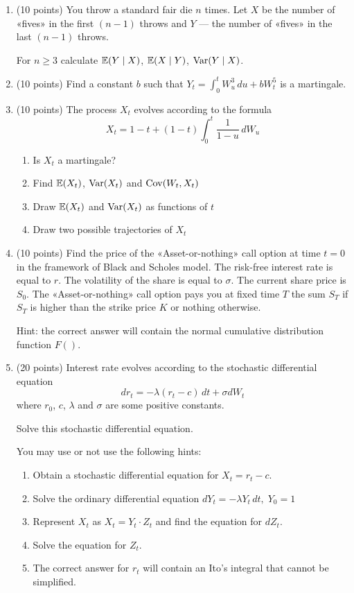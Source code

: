 \documentclass[12pt, a4paper]{article}
\begin{document}
\begin{enumerate}


\item (10 points) You throw a standard fair die $n$ times. Let $X$ be the number of «fives» in the first $(n-1)$ throws and $Y$ — the number of «fives» in the last $(n-1)$ throws.

For $n\geq 3$ calculate $\operatorname{\mathbb{E}}(Y \mid X)$, $\operatorname{\mathbb{E}}(X \mid Y)$, $\operatorname{Var}(Y \mid X)$.

\item (10 points) Find a constant $b$ such that $Y_t = \int_0^t W_u^3 \, du + b W_t^5$ is a martingale.


\item (10 points) The process $X_t$ evolves according to the formula
\[
X_t = 1 - t + (1 - t) \int_0^t \frac{1}{1-u} \, dW_u
\]

\begin{enumerate}
\item Is $X_t$ a martingale?
\item Find $\operatorname{\mathbb{E}}(X_t)$, $\operatorname{Var}(X_t)$ and $\operatorname{Cov}(W_t, X_t)$
\item Draw $\operatorname{\mathbb{E}}(X_t)$ and $\operatorname{Var}(X_t)$ as functions of $t$
\item Draw two possible trajectories of $X_t$
\end{enumerate}


\item (10 points) Find the price of the «Asset-or-nothing» call option at time $t=0$ in the framework of Black and Scholes model. The risk-free interest rate is equal to $r$. The volatility of the share is equal to $\sigma$. The current share price is $S_0$. The «Asset-or-nothing» call option pays you at fixed time $T$ the sum $S_T$ if $S_T$ is higher than the strike price $K$ or nothing otherwise.

Hint: the correct answer will contain the normal cumulative distribution function $F()$.

\item (20 points) Interest rate evolves according to the stochastic differential equation
\[
dr_t = -\lambda (r_t - c) \, dt + \sigma dW_t
\]
where $r_0$, $c$, $\lambda$ and $\sigma$ are some positive constants.

Solve this stochastic differential equation.

You may use or not use the following hints:

\begin{enumerate}
\item Obtain a stochastic differential equation for $X_t = r_t - c$.
\item Solve the ordinary differential equation $dY_t = -\lambda Y_t \, dt, \; Y_0 = 1$
\item Represent $X_t$ as $X_t = Y_t \cdot Z_t$ and find the equation for $dZ_t$.
\item Solve the equation for $Z_t$.
\item The correct answer for $r_t$ will contain an Ito's integral that cannot be simplified.
\end{enumerate}

\end{enumerate}
\end{document}

